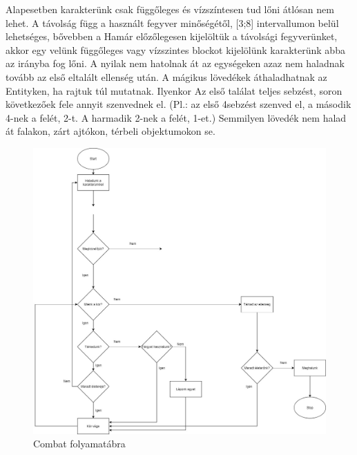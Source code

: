 
Alapesetben karakterünk csak függőleges és vízszíntesen tud lőni átlósan nem lehet. A távolság függ a használt fegyver minőségétől, [3;8] intervallumon belül lehetséges, bővebben a %
Hamár előzőlegesen kijelöltük a távolsági fegyverünket, akkor egy velünk függőleges vagy vízszintes blockot kijelölünk karakterünk abba az irányba fog lőni.
A nyilak nem hatolnak át az egységeken azaz nem haladnak tovább az első eltalált ellenség után.
A mágikus lövedékek áthaladhatnak az Entityken, ha rajtuk túl mutatnak. Ilyenkor Az első találat teljes sebzést, soron következőek fele annyit szenvednek el. (Pl.: az első 4sebzést szenved el, a második 4-nek a felét, 2-t. A harmadik 2-nek a felét, 1-et.)
Semmilyen lövedék nem halad át falakon, zárt ajtókon, térbeli objektumokon se.


\begin{figure}[h!]
	\centering
	\includegraphics[width=\textwidth]{images/image5.png}
	\caption{Combat folyamatábra}
	\label{fig:combat2}
\end{figure}

